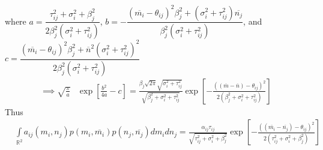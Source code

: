\documentclass{amsart}
\theoremstyle{definition}
\theoremstyle{remark}
\numberwithin{equation}{section}
\begin{document}
where $a = \dfrac{\tau_{ij}^2 + \sigma_i^2 + \beta_j^2}{2\beta_j^2(\sigma_i^2 + \tau_{ij}^2)}$, $b = -\dfrac{(\overline{m_i} - \theta_{ij})^2\beta_j^2 + (\sigma_i^2 + \tau_{ij}^2)\overline{n_j}}{\beta_j^2(\sigma_i^2 + \tau_{ij}^2)}$, and $c = \dfrac{(\overline{m_i} - \theta_{ij})^2\beta_j^2 + \overline{n}^2(\sigma_i^2 + \tau_{ij}^2)^2}{2\beta_j^2(\sigma_i^2 + \tau_{ij}^2)}$
\begin{align*}
	\implies \sqrt{\frac{\pi}{a}}&\exp\left[\frac{b^2}{4a} - c\right] = \frac{\beta_j\sqrt{2\pi}\sqrt{\sigma_i^2 + \tau_{ij}^2}}{\sqrt{\beta_j^2 + \sigma_i^2 + \tau_{ij}^2}}\exp\left[-\frac{((\overline{m} - \overline{n}) - \theta_{ij})^2}{2(\beta_j^2 + \sigma_i^2 + \tau_{ij}^2)}\right]
\end{align*}
Thus
\begin{align*}
	&\int\limits_{\mathbb{R}^2}a_{ij}(m_i, n_j)p(m_i, \overline{m_i})p(n_j, \overline{n_j})dm_idn_j = \frac{\alpha_{ij}\tau_{ij}}{\sqrt{\tau_{ij}^2 + \sigma_i^2 + \beta_j^2}}\exp{\left[-\frac{((\overline{m_i} - \overline{n_j}) - \theta_{ij})^2}{2(\tau_{ij}^2 + \sigma_i^2 + \beta_j^2)}\right]}
\end{align*}
\end{document}
